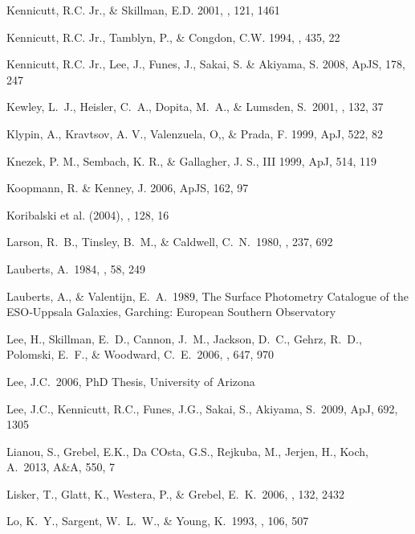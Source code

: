 \documentclass[12pt,preprint]{emulateapj}
\begin{document}
\begin{thebibliography}{}
Kennicutt, R.C. Jr., \& Skillman, E.D. 2001, \aj , 121, 1461 

Kennicutt, R.C. Jr., Tamblyn, P., \& Congdon, C.W. 1994, \apj , 435, 22

Kennicutt, R.C. Jr., Lee, J., Funes, J., Sakai, S. \& Akiyama, S. 2008, ApJS, 178, 247

Kewley, L.~J., Heisler, C.~A., Dopita, M.~A., \& Lumsden, S.\ 2001, \apjs, 132, 37 

Klypin, A., Kravtsov, A. V., Valenzuela, O,, \& Prada, F. 1999, ApJ, 522, 82

Knezek, P. M., Sembach, K. R., \& Gallagher, J. S., III 1999, ApJ, 514, 119

Koopmann, R. \& Kenney, J. 2006, ApJS, 162, 97

Koribalski et al. (2004),  \aj, 128, 16

Larson, R.~B., Tinsley, B.~M., \& Caldwell, C.~N.\ 1980, \apj, 237, 692 

Lauberts, A.\ 1984, \aaps, 58, 249 

Lauberts, A., \& Valentijn, E.~A.\ 1989,
The Surface Photometry Catalogue of the ESO‐Uppsala Galaxies,
Garching: European Southern Observatory  

Lee, H., Skillman, E.~D., Cannon, J.~M., Jackson, D.~C., Gehrz, R.~D., 
Polomski, E.~F., \& Woodward, C.~E.\ 2006, \apj, 647, 970 

Lee, J.C.\ 2006, PhD Thesis, University of Arizona

Lee, J.C., Kennicutt, R.C., Funes, J.G., Sakai, S., Akiyama, S.\ 2009, ApJ, 692, 1305

Lianou, S., Grebel, E.K., Da COsta, G.S., Rejkuba, M., Jerjen, H., Koch, A.\ 2013, A\&A, 550, 7

Lisker, T., Glatt, K., Westera, P., \& Grebel, E.~K.\ 2006, \aj, 132, 2432

Lo, K.~Y., Sargent, W.~L.~W., \& Young, K.\ 1993, \aj, 106, 507 


\end{thebibliography}
\end{document}
